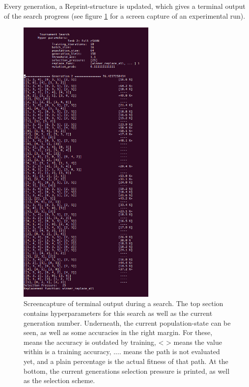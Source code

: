 Every generation, a Reprint-structure is updated, which gives a terminal output of the search progress (see figure \ref{fig:searchoutput} for a screen capture of an experimental run).
\begin{figure}[ht]
    \centering
    \includegraphics[width=0.6\textwidth]{Chapters/3.Implementation/figures/search_output.png}
    \caption[Terminal search output]{Screencapture of terminal output during a search. The top section contains hyperparameters for this search as well as the current generation number. Underneath, the current population-state can be seen, as well as some accuracies in the right margin. For these, \big[ \big] means the accuracy is outdated by training, \big< \big> means the value within is a training accuracy, .... means the path is not evaluated yet, and a plain percentage is the actual fitness of that path. At the bottom, the current generations selection pressure is printed, as well as the selection scheme.}
    \label{fig:searchoutput}
\end{figure}

